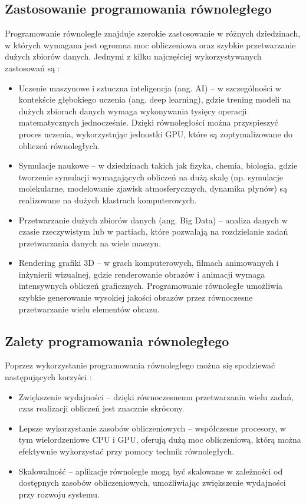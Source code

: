 \subsection{Zastosowanie programowania równoległego}
Programowanie równoległe znajduje szerokie zastosowanie w różnych dziedzinach, w których wymagana jest ogromna moc obliczeniowa oraz szybkie przetwarzanie dużych zbiorów danych. Jednymi z kilku najczęściej wykorzystywanych zastosowań są \cite{ParallelProgramming}:
\begin{itemize}
    \item Uczenie maszynowe i sztuczna inteligencja (ang. AI) – w szczególności w kontekście głębokiego uczenia (ang. deep learning), gdzie trening modeli na dużych zbiorach danych wymaga wykonywania tysięcy operacji matematycznych jednocześnie. Dzięki równoległości można przyspieszyć proces uczenia, wykorzystując jednostki GPU, które są zoptymalizowane do obliczeń równoległych.
    \item Symulacje naukowe – w dziedzinach takich jak fizyka, chemia, biologia, gdzie tworzenie symulacji wymagających obliczeń na dużą skalę (np. symulacje molekularne, modelowanie zjawisk atmosferycznych, dynamika płynów) są realizowane na dużych klastrach komputerowych.
    \item Przetwarzanie dużych zbiorów danych (ang. Big Data) – analiza danych w czasie rzeczywistym lub w partiach, które pozwalają na rozdzielanie zadań przetwarzania danych na wiele maszyn.
    \item Rendering grafiki 3D – w grach komputerowych, filmach animowanych i inżynierii wizualnej, gdzie renderowanie obrazów i animacji wymaga intensywnych obliczeń graficznych. Programowanie równoległe umożliwia szybkie generowanie wysokiej jakości obrazów przez równoczesne przetwarzanie wielu elementów obrazu.
\end{itemize}

\subsection{Zalety programowania równoległego}
Poprzez wykorzystanie programowania równoległego można się spodziewać następujących korzyści \cite{ParallelProgramming}:
\begin{itemize}
    \item Zwiększenie wydajności – dzięki równoczesnemu przetwarzaniu wielu zadań, czas realizacji obliczeń jest znacznie skrócony.
    \item Lepsze wykorzystanie zasobów obliczeniowych – współczesne procesory, w tym wielordzeniowe CPU i GPU, oferują dużą moc obliczeniową, którą można efektywnie wykorzystać przy pomocy technik równoległych.
    \item Skalowalność – aplikacje równoległe mogą być skalowane w zależności od dostępnych zasobów obliczeniowych, umożliwiając zwiększenie wydajności przy rozwoju systemu.
\end{itemize}

